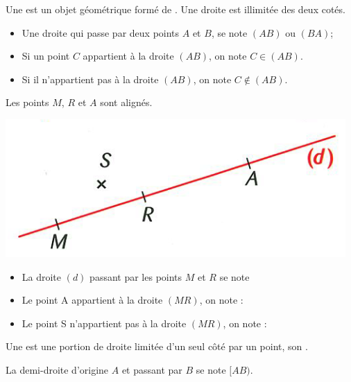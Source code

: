 \begin{mydef}
	Une  est un objet géométrique formé de . Une droite est illimitée des deux cotés.
\end{mydef}

\begin{myprops}
	\begin{itemize}
		\item Une droite qui passe par deux points $A$ et $B$, se note $(AB)$ ou $(BA)$;
		\item Si un point $C$ appartient à la droite $(AB)$, on note $C \in (AB)$.
		\item Si il n'appartient pas à la droite $(AB)$, on note $C \notin (AB)$.
	\end{itemize}
\end{myprops}

\begin{myex}
	Les points $M$, $R$ et $A$ sont alignés.
	\begin{center}
		\includegraphics[scale=0.55]{img/droite1}
	\end{center}

	\begin{itemize}
		\item La droite $(d)$ passant par les points $M$ et $R$ se note 
		\item Le point A appartient à la droite $(MR)$, on note :
		\item Le point S n'appartient pas à la droite $(MR)$, on note :
	\end{itemize}
\end{myex}

\begin{mydef}
	Une  est une portion de droite limitée d'un seul côté par un point, son .
\end{mydef}

\begin{myprop}
	La demi-droite d'origine $A$ et passant par $B$ se note $[AB)$.
\end{myprop}

